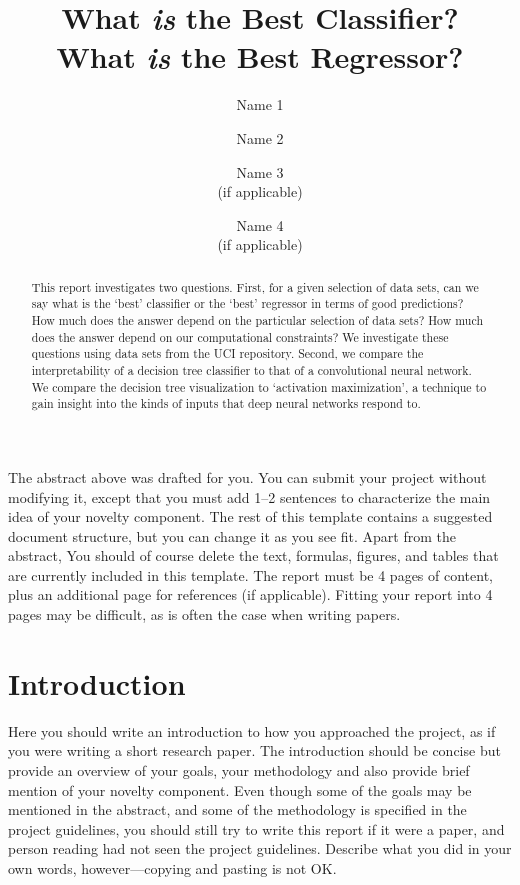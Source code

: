 \documentclass[10pt,twocolumn,letterpaper]{article}
\begin{document}
\title{What {\em is} the Best Classifier?\\
       What {\em is} the Best Regressor?}
\author{Name 1 \and Name 2 \and Name 3\\(if applicable) \and Name 4\\(if applicable)}
\maketitle

\begin{abstract}
   This report investigates two questions.
   First, for a given selection of data sets, can we say what
   is the `best' classifier or the `best' regressor in terms
   of good predictions?
   How much does the answer depend on the particular selection of data sets?
   How much does the answer depend on our computational constraints?
   We investigate these questions using data sets from the UCI repository.
   Second, we compare the interpretability of a decision tree
   classifier to that of a convolutional neural network.
   We compare the decision tree visualization
   to `activation maximization', a technique to gain insight into
   the kinds of inputs that deep neural networks respond to.
\end{abstract}

The abstract above was drafted for you.
You can submit your project without modifying it, except that you must
add 1--2 sentences to characterize the main idea of your novelty component.
The rest of this template contains a suggested document structure,
but you can change it as you see fit.
Apart from the abstract, You should of course delete the text, formulas, figures, and tables that are currently
included in this template.
The report must be 4 pages of content, plus an additional page for references (if applicable).
Fitting your report into 4 pages may be difficult, as is often the case when writing papers.

\section{Introduction}

Here you should write an introduction to how you approached the project,
as if you were writing a short research paper.
The introduction should be concise but provide an overview of your
goals, your methodology and also provide brief mention of your novelty component.
Even though some of the goals may be mentioned in the abstract,
and some of the methodology is specified in the project guidelines,
you should still try to write this report if it were a paper,
and person reading had not seen the project guidelines.
Describe what you did in your own words, however---copying and pasting is not OK.
\end{document}
